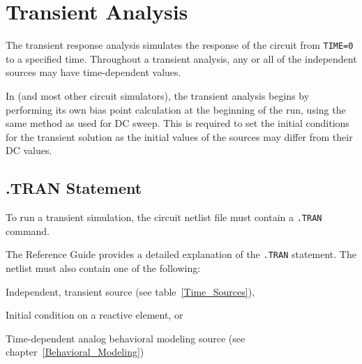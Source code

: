 \clearpage
\section{Transient Analysis}
\label{Trans_Overview}
\label{Transient_Analysis}
 

The transient response analysis simulates the response of the circuit
from \texttt{TIME=0} to a specified time.  Throughout a transient
analysis, any or all of the independent sources may have
time-dependent values.

In \Xyce{} (and most other circuit simulators), the transient analysis
begins by performing its own bias point calculation
at the beginning of the run, using the same method as used for DC
sweep. This is required to set the initial conditions for the
transient solution as the initial values of the sources may differ
from their DC values.

\subsection{.TRAN Statement}

To run a transient simulation, the circuit netlist file must contain a
\verb|.TRAN| command.


The \Xyce{} Reference Guide\ReferenceGuide{} provides a detailed
explanation of the \verb|.TRAN| statement. The netlist must also
contain one of the following:

\begin{XyceItemize}
\item Independent, transient source (see table~\ref{Time_Sources}),
\item Initial condition on a reactive element, or
\item Time-dependent analog behavioral modeling source (see chapter~\ref{Behavioral_Modeling})
\end{XyceItemize}

